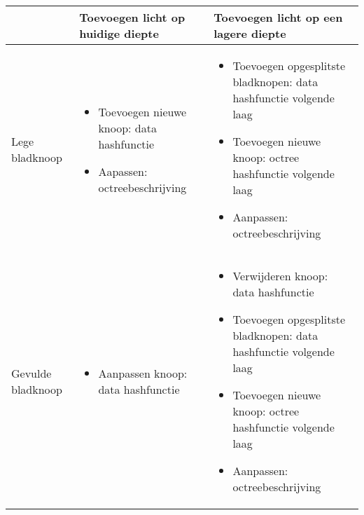\begin{table}[tbp]
  \centering
  \scriptsize
  \begin{tabularx}{\textwidth}{XXX}\toprule
                                      &
    Toevoegen licht op huidige diepte &
    Toevoegen licht op een lagere diepte \\ \midrule
    
      \vspace*{-16pt}
    \vspace{8pt}Lege bladknoop &

      \vspace*{-16pt}
      {\scriptsize
      \begin{itemize}
      \item Toevoegen nieuwe knoop: data hashfunctie 
      \item Aapassen: octreebeschrijving
      \end{itemize}}&
    
      \vspace*{-16pt}
      {\scriptsize
      \begin{itemize}
      \item Toevoegen opgesplitste bladknopen: data hashfunctie volgende laag
      \item Toevoegen nieuwe knoop: octree hashfunctie volgende laag
      \item Aanpassen: octreebeschrijving
      \end{itemize}}\\
   
      \vspace*{-16pt}
    \vspace{8pt}Gevulde bladknoop &
      
      \vspace*{-16pt}
      {\scriptsize
      \begin{itemize}
      \item Aanpassen knoop: data hashfunctie 
      \end{itemize}}&
      
      \vspace*{-16pt}
      \vspace*{-1.5mm}
      {\scriptsize
      \begin{itemize}
      \item Verwijderen knoop: data hashfunctie
      \item Toevoegen opgesplitste bladknopen: data hashfunctie volgende laag
      \item Toevoegen nieuwe knoop: octree hashfunctie volgende laag
      \item Aanpassen: octreebeschrijving
      \end{itemize}}\\
      

\end{tabularx}
\end{table}
